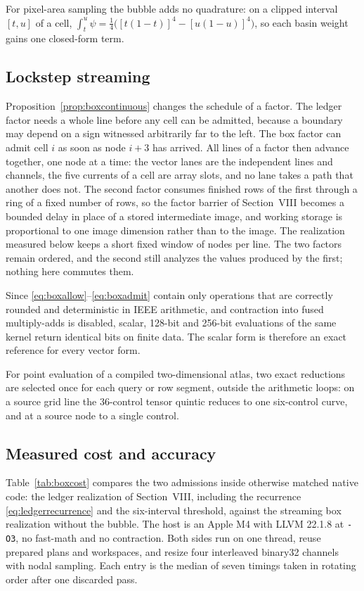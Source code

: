 \documentclass[journal]{IEEEtran}
\begin{document}
For pixel-area sampling the bubble adds no quadrature: on a clipped
interval \([t,u]\) of a cell,
\(\int_t^u\psi=\tfrac14\bigl([t(1-t)]^4-[u(1-u)]^4\bigr)\), so each
basin weight gains one closed-form term.

\subsection{Lockstep streaming}

Proposition~\ref{prop:boxcontinuous} changes the schedule of a factor.
The ledger factor needs a whole line before any cell can be admitted,
because a boundary may depend on a sign witnessed arbitrarily far to the
left. The box factor can admit cell \(i\) as soon as node \(i+3\) has
arrived. All lines of a factor then advance together, one node at a
time: the vector lanes are the independent lines and channels, the five
currents of a cell are array slots, and no lane takes a path that
another does not. The second factor consumes finished rows of the first
through a ring of a fixed number of rows, so the factor barrier of
Section~VIII becomes a bounded delay in place of a stored intermediate
image, and working storage is proportional to one image dimension
rather than to the image. The realization measured below keeps a short
fixed window of nodes per line. The two factors remain ordered, and the second
still analyzes the values produced by the first; nothing here commutes
them.

Since \eqref{eq:boxallow}--\eqref{eq:boxadmit} contain only operations
that are correctly rounded and deterministic in IEEE arithmetic, and
contraction into fused multiply-adds is disabled, scalar, 128-bit and
256-bit evaluations of the same kernel return identical bits on finite
data. The scalar form is therefore an exact reference for every vector
form.

For point evaluation of a compiled two-dimensional atlas, two exact
reductions are selected once for each query or row segment, outside the
arithmetic loops: on a source grid line the 36-control tensor quintic
reduces to one six-control curve, and at a source node to a single
control.

\subsection{Measured cost and accuracy}

Table~\ref{tab:boxcost} compares the two admissions inside otherwise
matched native code: the ledger realization of Section~VIII, including
the recurrence \eqref{eq:ledgerrecurrence} and the six-interval
threshold, against the streaming box realization without the bubble.
The host is an Apple M4 with LLVM 22.1.8 at \texttt{-O3}, no fast-math
and no contraction. Both sides run on one thread, reuse prepared plans
and workspaces, and resize four interleaved binary32 channels with
nodal sampling. Each entry is the median of seven timings taken in
rotating order after one discarded pass.
\end{document}
